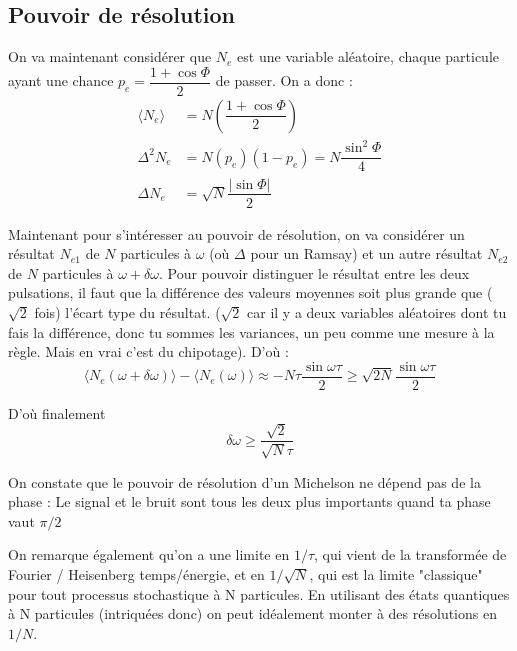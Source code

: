 \documentclass[a4paper]{report}
\begin{document}
\subsection{Pouvoir de résolution}
On va maintenant considérer que $N_e$ est une variable aléatoire, chaque particule ayant une chance $p_e=\dfrac{1+\cos \Phi}{2}$ de passer. On a donc :
\begin{align}
\langle N_e\rangle &= N\left(\dfrac{1+\cos \Phi}{2}\right) \\
\Delta^2 N_e &= N(p_e)(1-p_e) = N\dfrac{\sin ^2 \Phi}{4} \\
\Delta N_e &=\sqrt{N} \dfrac{|\sin \Phi|}{2}
\end{align}

Maintenant pour s'intéresser au pouvoir de résolution, on va considérer un résultat $N_{e1}$ de $N$ particules à $\omega$ (où $\Delta$ pour un Ramsay) et un autre résultat $N_{e2}$ de $N$ particules à $\omega + \delta \omega$. Pour pouvoir distinguer le résultat entre les deux pulsations, il faut que la différence des valeurs moyennes soit plus grande que ($\sqrt{2}$ fois) l'écart type du résultat. ($\sqrt{2}$ car il y a deux variables aléatoires dont tu fais la différence, donc tu sommes les variances, un peu comme une mesure à la règle. Mais en vrai c'est du chipotage). D'où : \begin{equation}
\langle N_e (\omega+ \delta \omega)\rangle - \langle N_e (\omega)\rangle \approx -N\tau\dfrac{\sin \omega \tau}{2} \geq \sqrt{2N} \dfrac{\sin \omega \tau}{2} 
\end{equation}

D'où finalement \begin{equation}
\delta \omega \geq \dfrac{\sqrt{2}}{\sqrt{N}\tau}
\end{equation}

On constate que le pouvoir de résolution d'un Michelson ne dépend pas de la phase : Le signal et le bruit sont tous les deux plus importants quand ta phase vaut $\pi/2$

On remarque également qu'on a une limite en $1/\tau$, qui vient de la transformée de Fourier / Heisenberg temps/énergie, et en $1/\sqrt{N}$, qui est la limite "classique" pour tout processus stochastique à N particules. En utilisant des états quantiques à N particules (intriquées donc) on peut idéalement monter à des résolutions en $1/N$.
  
\end{document}
